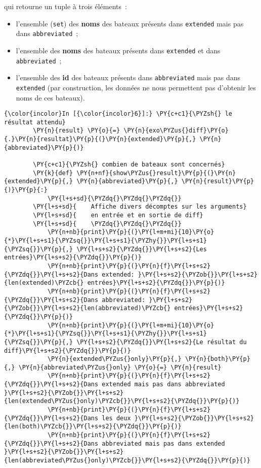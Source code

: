 qui retourne un tuple à trois éléments~:

\begin{itemize}
\tightlist
\item
  l'ensemble (\texttt{set}) des \textbf{noms} des bateaux présents dans
  \texttt{extended} mais pas dans \texttt{abbreviated}~;
\item
  l'ensemble des \textbf{noms} des bateaux présents dans
  \texttt{extended} et dans \texttt{abbreviated}~;
\item
  l'ensemble des \textbf{id} des bateaux présents dans
  \texttt{abbreviated} mais pas dans \texttt{extended} (par
  construction, les données ne nous permettent pas d'obtenir les noms de
  ces bateaux).
\end{itemize}

    \begin{Verbatim}[commandchars=\\\{\}]
{\color{incolor}In [{\color{incolor}6}]:} \PY{c+c1}{\PYZsh{} le résultat attendu}
        \PY{n}{result} \PY{o}{=} \PY{n}{exo\PYZus{}diff}\PY{o}{.}\PY{n}{resultat}\PY{p}{(}\PY{n}{extended}\PY{p}{,} \PY{n}{abbreviated}\PY{p}{)}
        
        \PY{c+c1}{\PYZsh{} combien de bateaux sont concernés}
        \PY{k}{def} \PY{n+nf}{show\PYZus{}result}\PY{p}{(}\PY{n}{extended}\PY{p}{,} \PY{n}{abbreviated}\PY{p}{,} \PY{n}{result}\PY{p}{)}\PY{p}{:}
            \PY{l+s+sd}{\PYZdq{}\PYZdq{}\PYZdq{}}
        \PY{l+s+sd}{    Affiche divers décomptes sur les arguments}
        \PY{l+s+sd}{    en entrée et en sortie de diff}
        \PY{l+s+sd}{    \PYZdq{}\PYZdq{}\PYZdq{}}
            \PY{n+nb}{print}\PY{p}{(}\PY{l+m+mi}{10}\PY{o}{*}\PY{l+s+s1}{\PYZsq{}}\PY{l+s+s1}{\PYZhy{}}\PY{l+s+s1}{\PYZsq{}}\PY{p}{,} \PY{l+s+s2}{\PYZdq{}}\PY{l+s+s2}{Les entrées}\PY{l+s+s2}{\PYZdq{}}\PY{p}{)}
            \PY{n+nb}{print}\PY{p}{(}\PY{n}{f}\PY{l+s+s2}{\PYZdq{}}\PY{l+s+s2}{Dans extended: }\PY{l+s+s2}{\PYZob{}}\PY{l+s+s2}{len(extended)\PYZcb{} entrées}\PY{l+s+s2}{\PYZdq{}}\PY{p}{)}
            \PY{n+nb}{print}\PY{p}{(}\PY{n}{f}\PY{l+s+s2}{\PYZdq{}}\PY{l+s+s2}{Dans abbreviated: }\PY{l+s+s2}{\PYZob{}}\PY{l+s+s2}{len(abbreviated)\PYZcb{} entrées}\PY{l+s+s2}{\PYZdq{}}\PY{p}{)}
            \PY{n+nb}{print}\PY{p}{(}\PY{l+m+mi}{10}\PY{o}{*}\PY{l+s+s1}{\PYZsq{}}\PY{l+s+s1}{\PYZhy{}}\PY{l+s+s1}{\PYZsq{}}\PY{p}{,} \PY{l+s+s2}{\PYZdq{}}\PY{l+s+s2}{Le résultat du diff}\PY{l+s+s2}{\PYZdq{}}\PY{p}{)}
            \PY{n}{extended\PYZus{}only}\PY{p}{,} \PY{n}{both}\PY{p}{,} \PY{n}{abbreviated\PYZus{}only} \PY{o}{=} \PY{n}{result}
            \PY{n+nb}{print}\PY{p}{(}\PY{n}{f}\PY{l+s+s2}{\PYZdq{}}\PY{l+s+s2}{Dans extended mais pas dans abbreviated }\PY{l+s+s2}{\PYZob{}}\PY{l+s+s2}{len(extended\PYZus{}only)\PYZcb{}}\PY{l+s+s2}{\PYZdq{}}\PY{p}{)}
            \PY{n+nb}{print}\PY{p}{(}\PY{n}{f}\PY{l+s+s2}{\PYZdq{}}\PY{l+s+s2}{Dans les deux }\PY{l+s+s2}{\PYZob{}}\PY{l+s+s2}{len(both)\PYZcb{}}\PY{l+s+s2}{\PYZdq{}}\PY{p}{)}
            \PY{n+nb}{print}\PY{p}{(}\PY{n}{f}\PY{l+s+s2}{\PYZdq{}}\PY{l+s+s2}{Dans abbreviated mais pas dans extended }\PY{l+s+s2}{\PYZob{}}\PY{l+s+s2}{len(abbreviated\PYZus{}only)\PYZcb{}}\PY{l+s+s2}{\PYZdq{}}\PY{p}{)}
        

\end{Verbatim}
